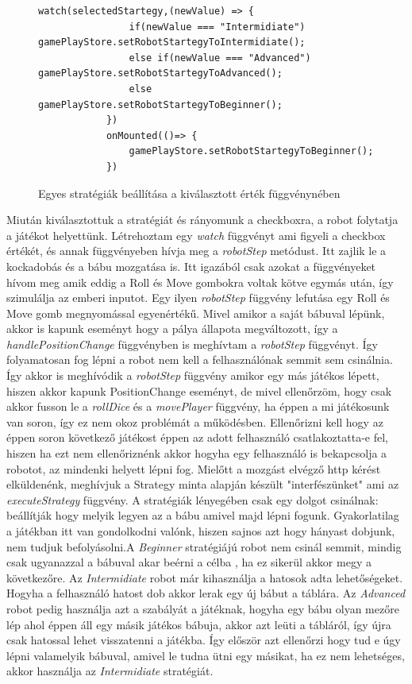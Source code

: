 \documentclass[a4paper,twoside]{article}
\begin{document}
\begin{figure}
	\caption{Egyes stratégiák beállítása a kiválasztott érték függvénynében}
	\begin{minipage}{\textwidth}
		\begin{lstlisting}[style=javascriptStyle]
			watch(selectedStartegy,(newValue) => {
				if(newValue === "Intermidiate") gamePlayStore.setRobotStartegyToIntermidiate();
				else if(newValue === "Advanced") gamePlayStore.setRobotStartegyToAdvanced();
				else gamePlayStore.setRobotStartegyToBeginner();
			})
			onMounted(()=> {
				gamePlayStore.setRobotStartegyToBeginner();
			})
		\end{lstlisting}
	\end{minipage}
	
	\label{setStrat}
\end{figure}
\FloatBarrier
Miután kiválasztottuk a stratégiát és rányomunk a checkboxra, a robot folytatja a játékot helyettünk. Létrehoztam egy \textit{watch} függvényt ami figyeli a checkbox értékét, és annak függvényeben hívja meg a \textit{robotStep} metódust. Itt zajlik le a kockadobás és a bábu mozgatása is. Itt igazából csak azokat a függvényeket hívom meg amik eddig a Roll és Move gombokra voltak kötve egymás után, így szimulálja az emberi inputot. Egy ilyen \textit{robotStep} függvény lefutása egy Roll és Move gomb megnyomással egyenértékű. Mivel amikor a saját bábuval lépünk, akkor is kapunk eseményt hogy a pálya állapota megváltozott, így a \textit{handlePositionChange} függvényben is meghívtam a \textit{robotStep} függvényt. Így folyamatosan fog lépni a robot nem kell a felhasználónak semmit sem csinálnia. Így akkor is meghívódik a \textit{robotStep} függvény amikor egy más játékos lépett, hiszen akkor kapunk PositionChange eseményt, de mivel ellenőrzöm, hogy csak akkor fusson le a \textit{rollDice} és a \textit{movePlayer} függvény, ha éppen a mi játékosunk van soron, így ez nem okoz problémát a működésben. Ellenőrizni kell hogy az éppen soron következő játékost éppen az adott felhasználó csatlakoztatta-e fel, hiszen ha ezt nem ellenőriznénk akkor hogyha egy felhasználó is bekapcsolja a robotot, az mindenki helyett lépni fog. Mielőtt a mozgást elvégző http kérést elküldenénk, meghívjuk a Strategy minta alapján készült "interfészünket" ami az \textit{executeStrategy} függvény. A stratégiák lényegében csak egy dolgot csinálnak: beállítják hogy melyik legyen az a bábu amivel majd lépni fogunk. Gyakorlatilag a játékban itt van gondolkodni valónk, hiszen sajnos azt hogy hányast dobjunk, nem tudjuk befolyásolni.A \textit{Beginner} stratégiájú robot nem csinál semmit, mindig csak ugyanazzal a bábuval akar beérni a célba , ha ez sikerül akkor megy a következőre. Az \textit{Intermidiate} robot már kihasználja a hatosok adta lehetőségeket. Hogyha a felhasználó hatost dob akkor lerak egy új bábut a táblára. Az \textit{Advanced} robot pedig használja azt a szabályát a játéknak, hogyha egy bábu olyan mezőre lép ahol éppen áll egy másik játékos bábuja, akkor azt leüti a tábláról, így újra csak hatossal lehet visszatenni a játékba. Így először azt ellenőrzi hogy tud e úgy lépni valamelyik bábuval, amivel le tudna ütni egy másikat, ha ez nem lehetséges, akkor használja az \textit{Intermidiate} stratégiát.
\end{document}
